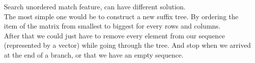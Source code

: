\bigskip

\par
Search unordered match feature, can have different solution.\\
The most simple one would be to construct a new suffix tree. By ordering the item of the matrix from smallest to biggest for every rows and columns.\\
After that we could just have to remove every element from our sequence (represented by a vector) while going through the tree. And stop when we arrived at the end of a branch, or that we have an empty sequence.\\